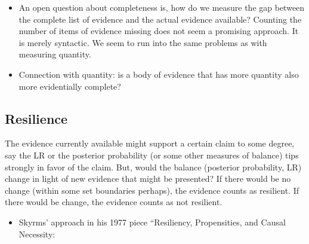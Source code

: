 \documentclass[
  10pt,
  dvipsnames,enabledeprecatedfontcommands]{scrartcl}
\providecommand{\tightlist}{%
  \setlength{\itemsep}{0pt}\setlength{\parskip}{0pt}}
\begin{document}
\begin{itemize}
\tightlist
\item
  An open question about completeness is, how do we measure the gap
  between the complete list of evidence and the actual evidence
  available? Counting the number of items of evidence missing does not
  seem a promising approach. It is merely syntactic. We seem to run into
  the same problems as with measuring quantity.
\end{itemize}


\begin{itemize}
\tightlist
\item
  Connection with quantity: is a body of evidence that has more quantity
  also more evidentially complete?
\end{itemize}


\hypertarget{resilience}{%
\subsection{Resilience}\label{resilience}}

The evidence currently available might support a certain claim to some
degree, say the LR or the posterior probability (or some other measures
of balance) tips strongly in favor of the claim. But, would the balance
(posterior probability, LR) change in light of new evidence that might
be presented? If there would be no change (within some set boundaries
perhaps), the evidence counts as resilient. If there would be change,
the evidence counts as not resilient.

\begin{itemize}
\tightlist
\item
  Skyrms' approach in his 1977 piece ``Resiliency, Propensities, and
  Causal Necessity:
\end{itemize}
\end{document}
